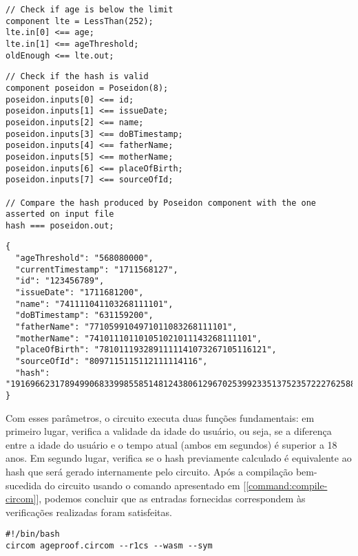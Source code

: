 \begin{lstlisting}[language=code, caption=Verificação de idade em arquivo \textit{ageProof.circom}, label=ageProof-age-label]
// Check if age is below the limit
component lte = LessThan(252);
lte.in[0] <== age;
lte.in[1] <== ageThreshold;
oldEnough <== lte.out; 
\end{lstlisting}

\begin{lstlisting}[language=code, caption=Verificação de hash em arquivo \textit{ageProof}.circom, label=ageProof-hash-label]
// Check if the hash is valid
component poseidon = Poseidon(8);
poseidon.inputs[0] <== id;
poseidon.inputs[1] <== issueDate;
poseidon.inputs[2] <== name;
poseidon.inputs[3] <== doBTimestamp;
poseidon.inputs[4] <== fatherName;
poseidon.inputs[5] <== motherName;
poseidon.inputs[6] <== placeOfBirth;
poseidon.inputs[7] <== sourceOfId;

// Compare the hash produced by Poseidon component with the one asserted on input file
hash === poseidon.out;
\end{lstlisting}


\begin{lstlisting}[language=code, caption=Arquivo input.json, label=input-label]
{
  "ageThreshold": "568080000",
  "currentTimestamp": "1711568127",
  "id": "123456789",
  "issueDate": "1711681200",
  "name": "741111041103268111101",
  "doBTimestamp": "631159200",
  "fatherName": "7710599104971011083268111101",
  "motherName": "741011101101051021011143268111101",
  "placeOfBirth": "7810111932891111141073267105116121",
  "sourceOfId": "8097115115112111114116",
  "hash": "19169662317894990683399855851481243806129670253992335137523572227625886599311"
}
\end{lstlisting}

Com esses parâmetros, o circuito executa duas funções fundamentais: em primeiro lugar, verifica a validade da idade do usuário, ou seja, se a diferença entre a idade do usuário e o tempo atual (ambos em segundos) é superior a 18 anos. Em segundo lugar, verifica se o hash previamente calculado é equivalente ao hash que será gerado internamente pelo circuito. Após a compilação bem-sucedida do circuito usando o comando apresentado em [\ref{command:compile-circom}], podemos concluir que as entradas fornecidas correspondem às verificações realizadas foram satisfeitas.


\begin{lstlisting}[style=shell, caption={Comando de compilação do circuito}, label=command:compile-circom]
#!/bin/bash
circom ageproof.circom --r1cs --wasm --sym
\end{lstlisting}

